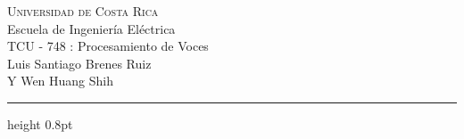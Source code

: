 \begin{center}
    \textsc{Universidad de Costa Rica} \\
    Escuela de Ingeniería Eléctrica \\
    TCU - 748 : Procesamiento de Voces \\
    \vspace{2mm}
    Luis Santiago Brenes Ruiz\\
    Y Wen Huang Shih
\end{center}

\vspace{-1mm}
\hrule height 0.8pt
\vspace{-2mm}